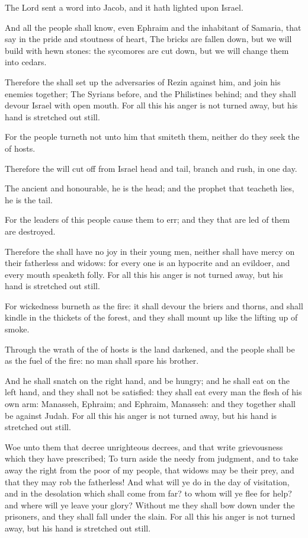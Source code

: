 \Verse The Lord sent a word into Jacob, and it hath lighted upon Israel.

\Verse And all the people shall know, even Ephraim and the inhabitant of Samaria, that say in the pride and stoutness of heart, \Verse The bricks are fallen down, but we will build with hewn stones: the sycomores are cut down, but we will change them into cedars.

\Verse Therefore the \LORD shall set up the adversaries of Rezin against him, and join his enemies together; \Verse The Syrians before, and the Philistines behind; and they shall devour Israel with open mouth. For all this his anger is not turned away, but his hand is stretched out still.

\Verse For the people turneth not unto him that smiteth them, neither do they seek the \LORD of hosts.

\Verse Therefore the \LORD will cut off from Israel head and tail, branch and rush, in one day.

\Verse The ancient and honourable, he is the head; and the prophet that teacheth lies, he is the tail.

\Verse For the leaders of this people cause them to err; and they that are led of them are destroyed.

\Verse Therefore the \LORD shall have no joy in their young men, neither shall have mercy on their fatherless and widows: for every one is an hypocrite and an evildoer, and every mouth speaketh folly. For all this his anger is not turned away, but his hand is stretched out still.

\Verse For wickedness burneth as the fire: it shall devour the briers and thorns, and shall kindle in the thickets of the forest, and they shall mount up like the lifting up of smoke.

\Verse Through the wrath of the \LORD of hosts is the land darkened, and the people shall be as the fuel of the fire: no man shall spare his brother.

\Verse And he shall snatch on the right hand, and be hungry; and he shall eat on the left hand, and they shall not be satisfied: they shall eat every man the flesh of his own arm: \Verse Manasseh, Ephraim; and Ephraim, Manasseh: and they together shall be against Judah. For all this his anger is not turned away, but his hand is stretched out still.


\Chapter
\Verse Woe unto them that decree unrighteous decrees, and that write grievousness which they have prescribed; \Verse To turn aside the needy from judgment, and to take away the right from the poor of my people, that widows may be their prey, and that they may rob the fatherless!  \Verse And what will ye do in the day of visitation, and in the desolation which shall come from far? to whom will ye flee for help?  and where will ye leave your glory?  \Verse Without me they shall bow down under the prisoners, and they shall fall under the slain. For all this his anger is not turned away, but his hand is stretched out still.


